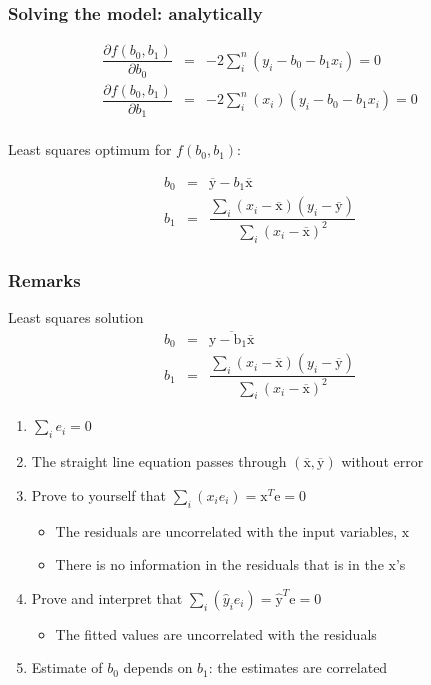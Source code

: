 \begin{frame}\frametitle{Solving the model: analytically}

	$$
	\begin{array}{rcl}
		\dfrac{\partial f(b_0, b_1)}{\partial{b_0}} &=& -2 \sum_i^{n}{(y_i - b_0 - b_1 x_i)} = 0 \\
		\dfrac{\partial f(b_0, b_1)}{\partial{b_1}} &=& -2 \sum_i^{n}{(x_i)(y_i - b_0 - b_1 x_i)} = 0 \\
	\end{array}
	$$

	\vspace{12pt}
	Least squares optimum for $f(b_0, b_1)$:

	$$
	\begin{array}{rcl}
		b_0 &=& \overline{\mathrm{y}} - b_1\overline{\mathrm{x}} \\
		b_1 &=& \dfrac{ \sum_i{\left(x_i - \overline{\mathrm{x}}\right)\left(y_i - \overline{\mathrm{y}}\right) } }{ \sum_i{\left( x_i - \overline{\mathrm{x}}\right)^2} }
	\end{array}
	$$
\end{frame}

\begin{frame}\frametitle{Remarks}
	\begin{block}{Least squares solution}
		$$
			\begin{array}{rcl}
				b_0 &=& \overline{\mathrm{y - b_1\overline{\mathrm{x}}}} \\
				b_1 &=& \dfrac{ \sum_i{\left(x_i - \overline{\mathrm{x}}\right)\left(y_i - \overline{\mathrm{y}}\right) } }{ \sum_i{\left( x_i - \overline{\mathrm{x}}\right)^2} }
			\end{array}
		$$
	\end{block}
	\begin{enumerate}
		\item	$\sum_i{e_i} = 0$
		\item	The straight line equation passes through $(\overline{\mathrm{x}}, \overline{\mathrm{y}})$ without error
		\item	Prove to yourself that $\sum_i{(x_i e_i)} = \mathrm{x}^T\mathrm{e} = 0$
		\begin{itemize}
			\item	The residuals are uncorrelated with the input variables, $\mathrm{x}$
			\item	There is no information in the residuals that is in the $\mathrm{x}$'s
		\end{itemize}
		\item	Prove and interpret that $\sum_i{(\hat{y}_i e_i)} = \hat{\mathrm{y}}^T\mathrm{e} = 0$
		\begin{itemize}
			\item	The fitted values are uncorrelated with the residuals
		\end{itemize}
		\item	Estimate of $b_0$ depends on $b_1$: the estimates are correlated
	\end{enumerate}
\end{frame}

